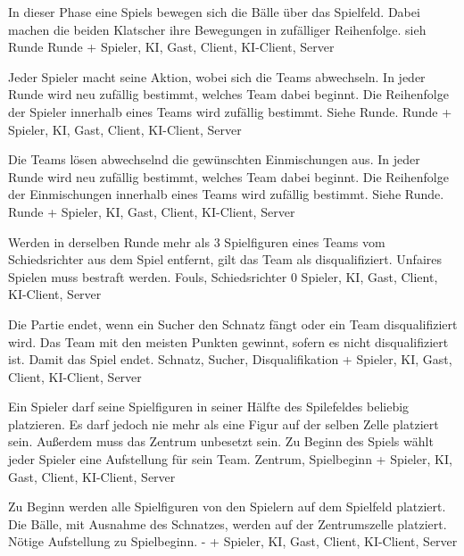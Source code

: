         {In dieser Phase eine Spiels bewegen sich die Bälle über das Spielfeld. Dabei machen die beiden Klatscher ihre Bewegungen in zufälliger Reihenfolge.}
        {sieh Runde}
        {Runde}
        {+}
        {Spieler, KI, Gast, Client, KI-Client, Server}
        
        {Jeder Spieler macht seine Aktion, wobei sich die Teams abwechseln. In jeder Runde wird neu zufällig bestimmt, welches Team dabei beginnt. Die Reihenfolge der Spieler innerhalb eines Teams wird zufällig bestimmt.}
        {Siehe Runde.}
        {Runde}
        {+}
        {Spieler, KI, Gast, Client, KI-Client, Server}
        
        {Die Teams lösen abwechselnd die gewünschten Einmischungen aus. In jeder Runde wird neu zufällig bestimmt, welches Team dabei beginnt. Die Reihenfolge der Einmischungen innerhalb eines Teams wird zufällig bestimmt.}
        {Siehe Runde.}
        {Runde}
        {+}
        {Spieler, KI, Gast, Client, KI-Client, Server}

        {Werden in derselben Runde mehr als 3 Spielfiguren eines Teams vom Schiedsrichter aus dem Spiel entfernt, gilt das Team als disqualifiziert.}
        {Unfaires Spielen muss bestraft werden.}
        {Fouls, Schiedsrichter}
        {0}
        {Spieler, KI, Gast, Client, KI-Client, Server}
        
        {Die Partie endet, wenn ein Sucher den Schnatz fängt oder ein Team disqualifiziert wird. Das Team mit den meisten Punkten gewinnt, sofern es nicht disqualifiziert ist.}
        {Damit das Spiel endet.}
        {Schnatz, Sucher, Disqualifikation}
        {+}
        {Spieler, KI, Gast, Client, KI-Client, Server}
        
        {Ein Spieler darf seine Spielfiguren in seiner Hälfte des Spilefeldes beliebig platzieren. Es darf jedoch nie mehr als eine Figur auf der selben Zelle platziert sein. Außerdem muss das Zentrum unbesetzt sein.}
        {Zu Beginn des Spiels wählt jeder Spieler eine Aufstellung für sein Team.}
        {Zentrum, Spielbeginn}
        {+}
        {Spieler, KI, Gast, Client, KI-Client, Server}	
        
        {Zu Beginn werden alle Spielfiguren von den Spielern auf dem Spielfeld platziert. Die Bälle, mit Ausnahme des Schnatzes, werden auf der Zentrumszelle platziert.}
        {Nötige Aufstellung zu Spielbeginn.}
        {-}
        {+}
        {Spieler, KI, Gast, Client, KI-Client, Server}
        
